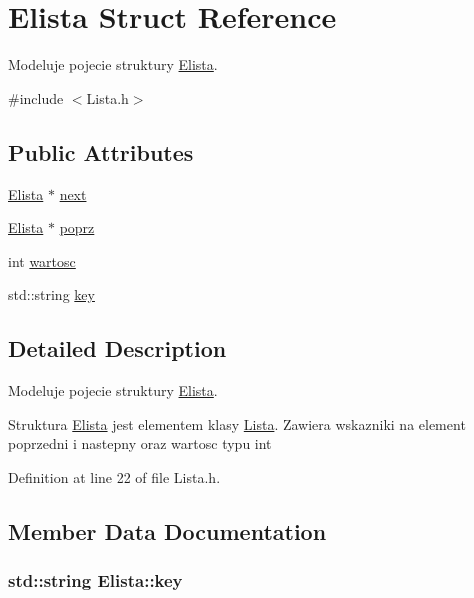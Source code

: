 \hypertarget{struct_elista}{\section{Elista Struct Reference}
\label{struct_elista}
}


Modeluje pojecie struktury \hyperlink{struct_elista}{Elista}.  




{\ttfamily \#include $<$Lista.\-h$>$}

\subsection*{Public Attributes}
\begin{DoxyCompactItemize}
\item 
\hyperlink{struct_elista}{Elista} $\ast$ \hyperlink{struct_elista_a2821644b4d0ca73d75a895cf326664da}{next}
\item 
\hyperlink{struct_elista}{Elista} $\ast$ \hyperlink{struct_elista_aa4bfee465e1ea4484c9aeddc2437e532}{poprz}
\item 
int \hyperlink{struct_elista_a8de211523404f6484098bc85dd1ce52b}{wartosc}
\item 
std\-::string \hyperlink{struct_elista_ada25f3f9728d5f10d17b083175ada416}{key}
\end{DoxyCompactItemize}


\subsection{Detailed Description}
Modeluje pojecie struktury \hyperlink{struct_elista}{Elista}. 

Struktura \hyperlink{struct_elista}{Elista} jest elementem klasy \hyperlink{class_lista}{Lista}. Zawiera wskazniki na element poprzedni i nastepny oraz wartosc typu int 

Definition at line 22 of file Lista.\-h.



\subsection{Member Data Documentation}
\hypertarget{struct_elista_ada25f3f9728d5f10d17b083175ada416}{
\subsubsection[{key}]{\setlength{\rightskip}{0pt plus 5cm}std\-::string Elista\-::key}}\label{struct_elista_ada25f3f9728d5f10d17b083175ada416}


